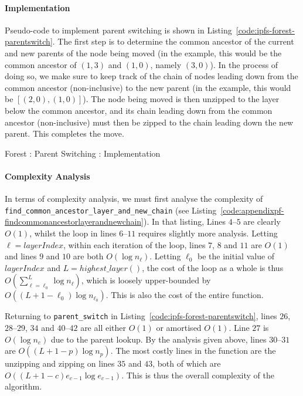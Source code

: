 \paragraph{Implementation}

Pseudo-code to implement parent switching is shown in Listing~\ref{code:ipfs-forest-parentswitch}. The first step is to determine the common ancestor of the current and new parents of the node being moved (in the example, this would be the common ancestor of $(1,3)$ and $(1,0)$, namely $(3,0)$). In the process of doing so, we make sure to keep track of the chain of nodes leading down from the common ancestor (non-inclusive) to the new parent (in the example, this would be $[(2,0), (1,0)]$). The node being moved is then unzipped to the layer below the common ancestor, and its chain leading down from the common ancestor (non-inclusive) must then be zipped to the chain leading down  the new parent. This completes the move.

\begin{stulisting}[p]
\caption{Forest : Parent Switching : Implementation}
\label{code:ipfs-forest-parentswitch}

\end{stulisting}

\paragraph{Complexity Analysis}

In terms of complexity analysis, we must first analyse the complexity of \texttt{find_common_ancestor_layer_and_new_chain} (see Listing~\ref{code:appendixpf-findcommonancestorlayerandnewchain}). In that listing, Lines $4$--$5$ are clearly $O(1)$, whilst the loop in lines $6$--$11$ requires slightly more analysis. Letting $\ell = \mathit{layerIndex}$, within each iteration of the loop, lines $7$, $8$ and $11$ are $O(1)$ and lines $9$ and $10$ are both $O(\log n_\ell)$. Letting $\ell_0$ be the initial value of $\mathit{layerIndex}$ and $L = \mathit{highest\_layer()}$, the cost of the loop as a whole is thus $O(\sum_{\ell=\ell_0}^L \log n_\ell)$, which is loosely upper-bounded by $O((L+1-\ell_0) \log n_{\ell_0})$. This is also the cost of the entire function.

Returning to \texttt{parent_switch} in Listing~\ref{code:ipfs-forest-parentswitch}, lines $26$, $28$--$29$, $34$ and $40$--$42$ are all either $O(1)$ or amortised $O(1)$. Line $27$ is $O(\log n_c)$ due to the parent lookup. By the analysis given above, lines $30$--$31$ are $O((L+1-p) \log n_p)$. The most costly lines in the function are the unzipping and zipping on lines $35$ and $43$, both of which are $O((L+1-c) e_{c-1} \log e_{c-1})$. This is thus the overall complexity of the algorithm.

